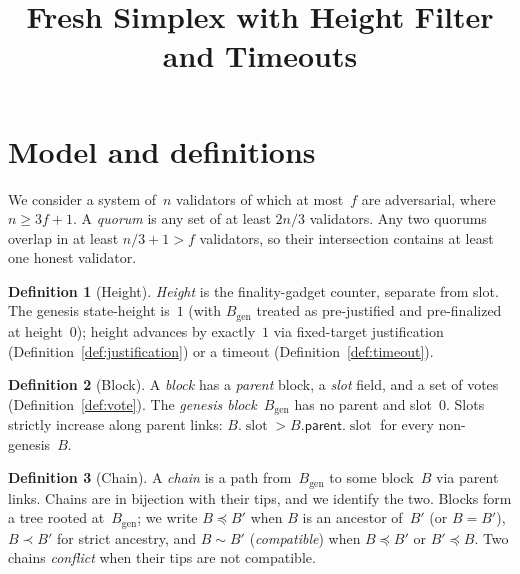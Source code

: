 \ifx\litemode\undefined\documentclass{article}\fi
\title{Fresh Simplex with Height Filter and Timeouts}
\newcommand{\genesis}{\ensuremath{B_{\mathrm{gen}}}}
\newcommand{\slot}[0]{\ensuremath{\operatorname{\mathrm{slot}}}}
\newcommand{\parent}{\mathsf{parent}}
\theoremstyle{plain}
\theoremstyle{definition}
\newtheorem{definition}{Definition}
\theoremstyle{remark}
\begin{document}
\maketitle
\section{Model and definitions}\label{sec:model}

We consider a system of~$n$ validators of which at most~$f$ are adversarial, where $n \geq 3f + 1$.
A \emph{quorum} is any set of at least $2n/3$ validators.
Any two quorums overlap in at least $n/3 + 1 > f$ validators, so their intersection contains at least one honest validator.

\begin{definition}[Height]\label{def:height}
\emph{Height} is the finality-gadget counter, separate from slot.
The genesis state-height is~$1$ (with $\genesis$ treated as pre-justified and pre-finalized at height~$0$); height advances by exactly~$1$ via fixed-target justification (Definition~\ref{def:justification}) or a timeout (Definition~\ref{def:timeout}).
\end{definition}

\begin{definition}[Block]\label{def:block}
A \emph{block} has a \emph{parent} block, a \emph{slot} field, and a set of votes (Definition~\ref{def:vote}).
The \emph{genesis block}~$\genesis$ has no parent and slot~$0$.
Slots strictly increase along parent links: $B.\slot > B.\parent.\slot$ for every non-genesis~$B$.
\end{definition}

\begin{definition}[Chain]\label{def:chain}
A \emph{chain} is a path from~$\genesis$ to some block~$B$ via parent links.
Chains are in bijection with their tips, and we identify the two.
Blocks form a tree rooted at~$\genesis$; we write $B \preceq B'$ when $B$ is an ancestor of~$B'$ (or $B = B'$), $B \prec B'$ for strict ancestry, and $B \sim B'$ (\emph{compatible}) when $B \preceq B'$ or $B' \preceq B$.
Two chains \emph{conflict} when their tips are not compatible.
\end{definition}
\end{document}
